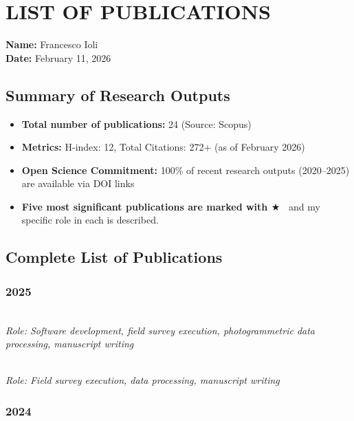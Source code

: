 \documentclass[11pt,a4paper]{article}
\newcommand{\starred}{\ensuremath{\bigstar}~}
\begin{document}

\section*{LIST OF PUBLICATIONS}

\noindent\textbf{Name:} Francesco Ioli \\
\textbf{Date:} February 11, 2026

\subsection*{Summary of Research Outputs}

\begin{itemize}[nosep]
    \item \textbf{Total number of publications:} 24 (Source: Scopus)
    \item \textbf{Metrics:} H-index: 12, Total Citations: 272+ (as of February 2026)
    \item \textbf{Open Science Commitment:} 100\% of recent research outputs (2020--2025) are available via DOI links
    \item \textbf{Five most significant publications are marked with \starred} and my specific role in each is described.
\end{itemize}

\subsection*{Complete List of Publications}

\subsubsection*{2025}

\noindent{} \\
\textit{Role: Software development, field survey execution, photogrammetric data processing, manuscript writing}

\vspace{8pt}
\noindent{} \\
\textit{Role: Field survey execution, data processing, manuscript writing}

\subsubsection*{2024}
\end{document}
